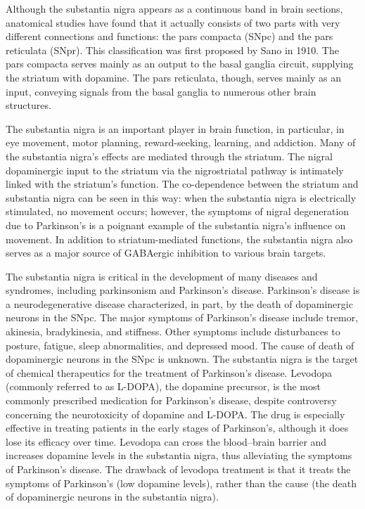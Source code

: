 Although the substantia nigra appears as a continuous band in brain sections, anatomical studies have found that it actually consists of two parts with very different connections and functions: the pars compacta (SNpc) and the pars reticulata (SNpr). This classification was first proposed by Sano in 1910. The pars compacta serves mainly as an output to the basal ganglia circuit, supplying the striatum with dopamine. The pars reticulata, though, serves mainly as an input, conveying signals from the basal ganglia to numerous other brain structures.

The substantia nigra is an important player in brain function, in particular, in eye movement, motor planning, reward-seeking, learning, and addiction. Many of the substantia nigra's effects are mediated through the striatum. The nigral dopaminergic input to the striatum via the nigrostriatal pathway is intimately linked with the striatum's function. The co-dependence between the striatum and substantia nigra can be seen in this way: when the substantia nigra is electrically stimulated, no movement occurs; however, the symptoms of nigral degeneration due to Parkinson's is a poignant example of the substantia nigra's influence on movement. In addition to striatum-mediated functions, the substantia nigra also serves as a major source of GABAergic inhibition to various brain targets.

The substantia nigra is critical in the development of many diseases and syndromes, including parkinsonism and Parkinson's disease.
Parkinson's disease is a neurodegenerative disease characterized, in part, by the death of dopaminergic neurons in the SNpc. The major symptoms of Parkinson's disease include tremor, akinesia, bradykinesia, and stiffness. Other symptoms include disturbances to posture, fatigue, sleep abnormalities, and depressed mood. The cause of death of dopaminergic neurons in the SNpc is unknown. The substantia nigra is the target of chemical therapeutics for the treatment of Parkinson's disease. Levodopa (commonly referred to as L-DOPA), the dopamine precursor, is the most commonly prescribed medication for Parkinson's disease, despite controversy concerning the neurotoxicity of dopamine and L-DOPA. The drug is especially effective in treating patients in the early stages of Parkinson's, although it does lose its efficacy over time. Levodopa can cross the blood--brain barrier and increases dopamine levels in the substantia nigra, thus alleviating the symptoms of Parkinson's disease. The drawback of levodopa treatment is that it treats the symptoms of Parkinson's (low dopamine levels), rather than the cause (the death of dopaminergic neurons in the substantia nigra).

